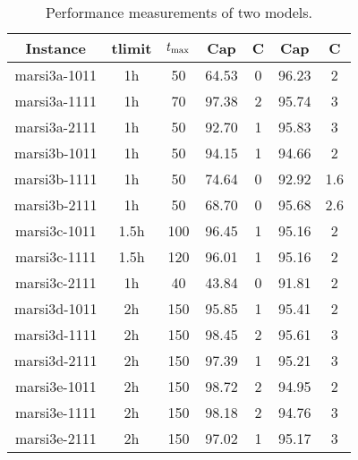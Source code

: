 \begin{table}[h]
    \begin{center}
        \begin{tabular}{|c|c|c|c|c|c|c|}
            \hline
            Instance & tlimit & $t_{\max}$ & Cap & C & Cap & C\\
            \hline
            marsi3a-1011 & 1h & 50 & 64.53 & 0 & 96.23 & 2\\
            marsi3a-1111 & 1h & 70 & 97.38 & 2 & 95.74 & 3\\
            marsi3a-2111 & 1h & 50 & 92.70 & 1 & 95.83 & 3\\
            marsi3b-1011 & 1h & 50 & 94.15 & 1 & 94.66 & 2\\
            marsi3b-1111 & 1h & 50 & 74.64 & 0 & 92.92 & 1.6\\
            marsi3b-2111 & 1h & 50 & 68.70 & 0 & 95.68 & 2.6\\
            marsi3c-1011 & 1.5h & 100 & 96.45 & 1 & 95.16 & 2\\
            marsi3c-1111 & 1.5h & 120 & 96.01 & 1 & 95.16 & 2\\
            marsi3c-2111 & 1h & 40 & 43.84 & 0 & 91.81 & 2\\
            marsi3d-1011 & 2h & 150 & 95.85 & 1 & 95.41 & 2\\
            marsi3d-1111 & 2h & 150 & 98.45 & 2 & 95.61 & 3\\
            marsi3d-2111 & 2h & 150 & 97.39 & 1 & 95.21 & 3\\
            marsi3e-1011 & 2h & 150 & 98.72 & 2 & 94.95 & 2\\
            marsi3e-1111 & 2h & 150 & 98.18 & 2 & 94.76 & 3\\
            marsi3e-2111 & 2h & 150 & 97.02 & 1 & 95.17 & 3\\
            \hline
        \end{tabular}
        \caption{Performance measurements of two models.}
        \label{tbl:compare}
    \end{center}
\end{table}

